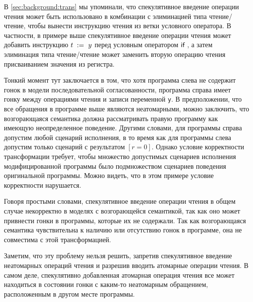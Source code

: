 В \cref{sec:background:trans} мы упоминали, 
что спекулятивное введение операции чтения может быть 
использовано в комбинации с элиминацией 
типа чтение/чтение, чтобы вынести инструкцию чтения
из  ветки условного оператора. 
В частности, в примере выше  
спекулятивное введение операции чтения может добавить 
инструкцию $t\;:=_{}\;y$ перед условным оператором $\textsf{if}~$, 
а затем элиминация типа чтение/чтение может заменить 
вторую операцию чтения присваиванием значения из регистра. 

Тонкий момент тут заключается в том, что хотя 
программа слева не содержит гонок в модели 
последовательной согласованности, 
программа справа имеет гонку между 
операциями чтения и записи переменной \texttt{y}.
В предположении, что все 
обращения в программе выше являются неатомарными, 
можно заключить, что возгорающаяся семантика 
должна рассматривать правую программу как 
имеющую неопределенное поведение. 
Другими словами, для программы справа 
допустим любой сценарий исполнения, 
в то время как для программы слева 
допустим только сценарий с результатом ${[r=0]}$.
Однако условие корректности трансформации требует, 
чтобы множество допустимых сценариев исполнения 
модифицированной программы было подмножеством 
сценариев поведения оригинальной программы. 
Можно видеть, что в этом примере условие корректности нарушается. 

Говоря простыми словами, спекулятивное введение операции чтения 
в общем случае некорректно в моделях с возгорающейся семантикой,
так как оно может привнести гонки в программы, 
которые их не содержали. 
Так как возгорающаяся семантика чувствительна 
к наличию или отсутствию гонок в программе, 
она не совместима с этой трансформацией. 

Заметим, что эту проблему нельзя решить, 
запретив спекулятивное введение неатомарных операций чтения 
и разрешив вводить атомарные операции чтения. 
В самом деле, спекулятивно добавленная атомарная операция чтения
все может находиться в состоянии гонки с 
каким-то неатомарным обращением, расположенным в другом месте программы. 
